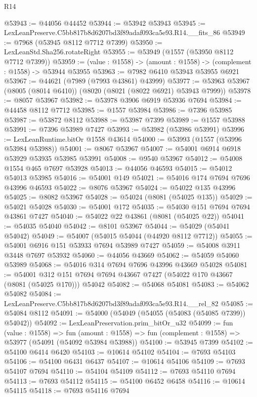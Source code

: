 \begin{lexlean}{R14}
\begin{coremodule}
@53943 := @44056 @44452
@53944 := @53942 @53943
@53945 := LexLeanPreserve.C5bb817b8d6207bd3f89adaf093ca5e93.R14.__fits_86
@53949 := @7968 (@53945 @8112 @7712 @7399)
@53950 := LexLeanStd.Sha256.rotateRight
@53955 := @53949 (@1557 (@53950 @8112 @7712 @7399))
@53959 := (value : @1558) -> (amount : @1558) -> (complement : @1558) -> @53944 @53955
@53963 := @7982 @6410 @53943 @53955 @6921
@53967 := @44621 (@7989 (@7993 @43861) @43999)
@53977 := @53963 @53967 (@8005 (@8014 @6410)) (@8020 (@8021 (@8022 @6921) @53943 @7999))
@53978 := @8057 @53967
@53982 := @53978 @3906 @6919 @53936 @7694
@53984 := @44458 @8112 @7712
@53985 := @1557 @53984
@53986 := @7396 @53985
@53987 := @53872 @8112
@53988 := @53987 @7399
@53989 := @1557 @53988
@53991 := @7396 @53989 @7427
@53993 := @53982 (@53986 @53991)
@53996 := LexLeanRuntime.bitOr @1558 @43614
@54000 := @53993 (@1557 (@53996 @53984 @53988))
@54001 := @8067 @53967
@54007 := @54001 @6914 @6918 @53929 @53935 @53985 @53991
@54008 := @9540 @53967
@54012 := @54008 @1554 @465 @7697 @53928
@54013 := @44056 @46593
@54015 := @54012 @54013 @53985
@54016 := @54001 @149
@54021 := @54016 @174 @7694 @7696 @43996 @46593
@54022 := @8076 @53967
@54024 := @54022 @135 @43996
@54025 := @8082 @53967
@54028 := @54024 (@8081 (@54025 @135))
@54029 := @54021 @54028
@54030 := @54001 @172
@54035 := @54030 @151 @7694 @7694 @43861 @7427
@54040 := @54022 @22 @43861 (@8081 (@54025 @22))
@54041 := @54035 @54040
@54042 := @8101 @53967
@54044 := @54029 (@54041 @54042)
@54049 := @54007 (@54015 @54044 (@44920 @8112 @7712))
@54055 := @54001 @6916 @151 @53933 @7694 @53989 @7427
@54059 := @54008 @3911 @3448 @7697 @53932
@54060 := @44056 @43669
@54062 := @54059 @54060 @53989
@54068 := @54016 @314 @7694 @7696 @43996 @43669 @54028
@54081 := @54001
    @312
    @151
    @7694
    @7694
    @43667
    @7427
    (@54022 @170 @43667 (@8081 (@54025 @170)))
    @54042
@54082 := @54068 @54081
@54083 := @54062 @54082
@54084 := LexLeanPreserve.C5bb817b8d6207bd3f89adaf093ca5e93.R14.__rel_82
@54085 := @54084 @8112
@54091 := @54000 (@54049 (@54055 (@54083 (@54085 @7399)) @54042))
@54092 := LexLeanPreservation.prim_bitOr_u32
@54099 := fun (value : @1558) =>
  fun (amount : @1558) => fun (complement : @1558) => @53977 (@54091 (@54092 @53984 @53988))
@54100 := @53945 @7399
@54102 := @54100 @6414 @6420
@54103 := @10614 @54102
@54104 := @7693 @54103
@54106 := @54100 @6431 @6437
@54107 := @10614 @54106
@54109 := @7693 @54107 @7694
@54110 := @54104 @54109
@54112 := @7693 @54110 @7694
@54113 := @7693 @54112
@54115 := @54100 @6452 @6458
@54116 := @10614 @54115
@54118 := @7693 @54116 @7694

\end{coremodule}
\end{lexlean}
